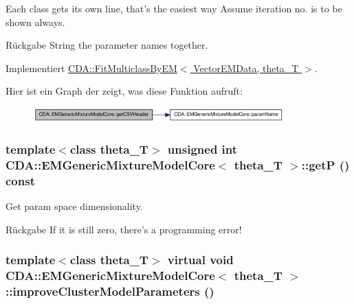 Each class gets its own line, that's the easiest way Assume iteration no. is to be shown always. 

\begin{DoxyReturn}{Rückgabe}
String the parameter names together. 
\end{DoxyReturn}


Implementiert \hyperlink{classCDA_1_1FitMulticlassByEM_aec99fc55d806d855e02b9a2fc96887a0}{CDA::FitMulticlassByEM$<$ VectorEMData, theta\_\-T $>$}.



Hier ist ein Graph der zeigt, was diese Funktion aufruft:\nopagebreak
\begin{figure}[H]
\begin{center}
\leavevmode
\includegraphics[width=274pt]{classCDA_1_1EMGenericMixtureModelCore_a10bd69fd4b420a274aee5f10e09ed5fe_cgraph}
\end{center}
\end{figure}


\hypertarget{classCDA_1_1EMGenericMixtureModelCore_a17fbd5259ce15213dc4087c105b4a03e}{
\subsubsection[{getP}]{\setlength{\rightskip}{0pt plus 5cm}template$<$class theta\_\-T$>$ unsigned int {\bf CDA::EMGenericMixtureModelCore}$<$ theta\_\-T $>$::getP () const}}
\label{classCDA_1_1EMGenericMixtureModelCore_a17fbd5259ce15213dc4087c105b4a03e}


Get param space dimensionality. 

\begin{DoxyReturn}{Rückgabe}
If it is still zero, there's a programming error! 
\end{DoxyReturn}
\hypertarget{classCDA_1_1EMGenericMixtureModelCore_aed2b50eb2bb8582204e186e3d5834c0a}{
\subsubsection[{improveClusterModelParameters}]{\setlength{\rightskip}{0pt plus 5cm}template$<$class theta\_\-T$>$ virtual void {\bf CDA::EMGenericMixtureModelCore}$<$ theta\_\-T $>$::improveClusterModelParameters ()}}
\label{classCDA_1_1EMGenericMixtureModelCore_aed2b50eb2bb8582204e186e3d5834c0a}


